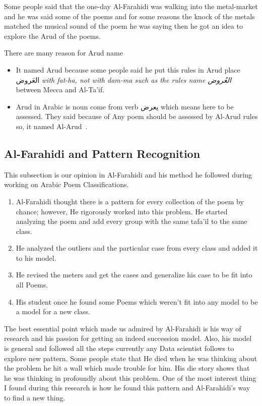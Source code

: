   Some people said that the one-day Al-Farahidi was walking into the metal-market and he was said some of the poems and for some reasons the knock of the metals matched the musical sound of the poem he was saying then he got an idea to explore the Arud of the poems.

 There are many reason for Arud name 
  \begin{itemize}
  \item It named Arud because some people said he put this rules in Arud place \textarabic{العَروض} \textit{with fat-ha, not with dam-ma such as the rules name \textarabic{العُروض} } between Mecca and Al-Ta'if\cite{AlQuaed}.
  \item Arud in Arabic is noun come from verb \textarabic{يعرض} which means here to be assessed. They said because of Any poem should be assessed by Al-Arud rules so, it named Al-Arud~\cite{Alkafi1994}.
  \end{itemize}
  
  

  
    \newpage
    \subsection{Al-Farahidi and Pattern Recognition}
    This subsection is our opinion in Al-Farahidi and his method he followed during working on Arabic Poem Classifications.

\begin{enumerate}


\item Al-Farahidi thought there is a pattern for every collection of the poem by chance; however, He rigorously worked into this problem. He started analyzing the poem and add every group with the same tafa'il to the same class.
\item He analyzed the outliers and the particular case from every class and added it to his model.
\item He revised the meters and get the cases and generalize his case to be fit into all Poems.
\item His student once he found some Poems which weren't fit into any model to be a model for a new class.

\end{enumerate}
The best essential point which made us admired by Al-Farahidi is his way of research and his passion for getting an indeed succession model. Also, his model is general and followed all the steps currently any Data scientist follows to explore new pattern. Some people state that He died when he was thinking about the problem he hit a wall which made trouble for him. His die story shows that he was thinking in profoundly about this problem. One of the most interest thing I found during this research is how he found this pattern and Al-Farahidi’s way to find a new thing.

